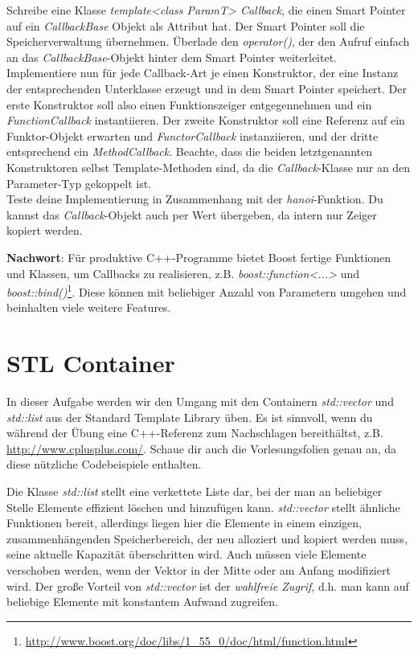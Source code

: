 \documentclass[
  accentcolor=tud1c,	%
  colorbacktitle,		%
  inverttitle,			%
  german,				%
  twoside
]{tudexercise}
\begin{document}
\begin{enumerate}
Schreibe eine Klasse \emph{template<class ParamT> Callback}, die einen Smart Pointer auf ein \emph{CallbackBase} Objekt als Attribut hat. Der Smart Pointer soll die Speicherverwaltung übernehmen. Überlade den \emph{operator()}, der den Aufruf einfach an das \emph{CallbackBase}-Objekt hinter dem Smart Pointer weiterleitet. \\

Implementiere nun für jede Callback-Art je einen Konstruktor, der eine Instanz der entsprechenden Unterklasse erzeugt und in dem Smart Pointer speichert.
Der erste Konstruktor soll also einen Funktionszeiger entgegennehmen und ein \emph{FunctionCallback} instantiieren.
Der zweite Konstruktor soll eine Referenz auf ein Funktor-Objekt erwarten und  \emph{FunctorCallback} instanziieren, und der dritte entsprechend ein \emph{MethodCallback}.
Beachte, dass die beiden letztgenannten Konstruktoren selbst Template-Methoden sind, da die \emph{Callback}-Klasse nur an den Parameter-Typ gekoppelt ist.\\

Teste deine Implementierung in Zusammenhang mit der \emph{hanoi}-Funktion. Du kannst das \emph{Callback}-Objekt auch per Wert übergeben, da intern nur Zeiger kopiert werden. 

\end{enumerate}

\textbf{Nachwort}:
Für produktive C++-Programme bietet Boost fertige Funktionen und Klassen, um Callbacks zu realisieren, z.B. \emph{boost::function<...>} und \emph{boost::bind()}\footnote{\url{http://www.boost.org/doc/libs/1_55_0/doc/html/function.html}}. Diese können mit beliebiger Anzahl von Parametern umgehen und beinhalten viele weitere Features.



\section{STL Container} 
In dieser Aufgabe werden wir den Umgang mit den Containern \emph{std::vector} und \emph{std::list} aus der Standard Template Library üben.
Es ist sinnvoll, wenn du während der Übung eine C++-Referenz zum Nachschlagen bereithältst, z.B. \url{http://www.cplusplus.com/}.
Schaue dir auch die Vorlesungsfolien genau an, da diese nützliche Codebeispiele enthalten.

Die Klasse \emph{std::list} stellt eine verkettete Liste dar, bei der man an beliebiger Stelle Elemente effizient löschen und hinzufügen kann. \emph{std::vector} stellt ähnliche Funktionen bereit, allerdings liegen hier die Elemente in einem einzigen, zusammenhängenden Speicherbereich, der neu alloziert und kopiert werden muss, seine aktuelle Kapazität überschritten wird.
Auch müssen viele Elemente verschoben werden, wenn der Vektor in der Mitte oder am Anfang modifiziert wird.
Der große Vorteil von \emph{std::vector} ist der \emph{wahlfreie Zugrif}, d.h. man kann auf beliebige Elemente mit konstantem Aufwand zugreifen.
\end{document}
